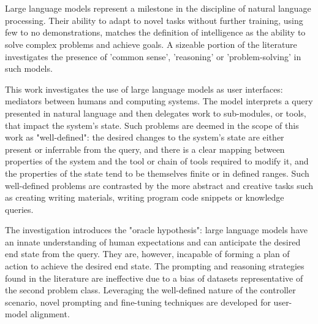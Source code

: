 \chapter{\abstractname}

Large language models represent a milestone in the discipline of natural language processing. Their ability to adapt to novel tasks without further training, using few to no demonstrations, matches the definition of intelligence as the ability to solve complex problems and achieve goals. A sizeable portion of the literature investigates the presence of 'common sense', 'reasoning' or 'problem-solving' in such models.
 
This work investigates the use of large language models as user interfaces: mediators between humans and computing systems. The model interprets a query presented in natural language and then delegates work to sub-modules, or tools, that impact the system's state. Such problems are deemed in the scope of this work as "well-defined": the desired changes to the system's state are either present or inferrable from the query, and there is a clear mapping between properties of the system and the tool or chain of tools required to modify it, and the properties of the state tend to be themselves finite or in defined ranges. Such well-defined problems are contrasted by the more abstract and creative tasks such as creating writing materials, writing program code snippets or knowledge queries.

The investigation introduces the "oracle hypothesis": large language models have an innate understanding of human expectations and can anticipate the desired end state from the query. They are, however, incapable of forming a plan of action to achieve the desired end state. The prompting and reasoning strategies found in the literature are ineffective due to a bias of datasets representative of the second problem class. Leveraging the well-defined nature of the controller scenario, novel prompting and fine-tuning techniques are developed for user-model alignment. 



\makeatletter
{}
{\renewcommand{\abstractname}{Kurzfassung}}
{\renewcommand{\abstractname}{Abstract}}
\makeatother

\chapter{\abstractname}

\begin{otherlanguage}{ngerman} %

\end{otherlanguage}


\makeatletter
{}
{\renewcommand{\abstractname}{Abstract}}
{\renewcommand{\abstractname}{Kurzfassung}}
\makeatother
